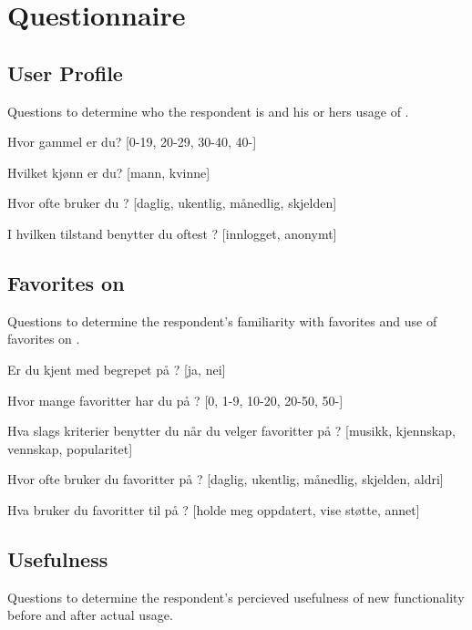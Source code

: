 \chapter{Questionnaire}
\label{appendix:questionnaire}

\section{User Profile}

Questions to determine who the respondent is and his or hers usage of
\urort{}.

\begin{items}
  \item Hvor gammel er du? [0-19, 20-29, 30-40, 40-]
  \item Hvilket kjønn er du? [mann, kvinne]
  \item Hvor ofte bruker du \urort{}? [daglig, ukentlig, månedlig, skjelden]
  \item I hvilken tilstand benytter du oftest \urort{}? [innlogget, anonymt]
\end{items}

\section{Favorites on \urort{}}

Questions to determine the respondent's familiarity with favorites and use of
favorites on \urort{}.

\begin{items}
  \item Er du kjent med begrepet  på \urort{}? [ja, nei]
  \item Hvor mange favoritter har du på \urort{}? [0, 1-9, 10-20, 20-50, 50-]
  \item Hva slags kriterier benytter du når du velger favoritter på
    \urort{}? [musikk, kjennskap, vennskap, popularitet]
  \item Hvor ofte bruker du favoritter på \urort{}?
    [daglig, ukentlig, månedlig, skjelden, aldri]
  \item Hva bruker du favoritter til på \urort{}?
    [holde meg oppdatert, vise støtte, annet]
\end{items}

\section{Usefulness}

Questions to determine the respondent's percieved usefulness of new
functionality before and after actual usage.

